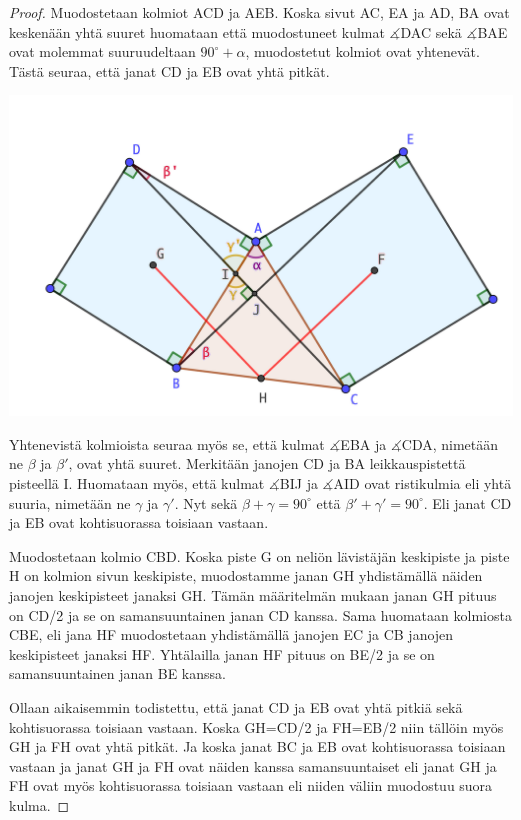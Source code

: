 \documentclass{scrartcl}
\begin{document}
\begin{proof}
Muodostetaan kolmiot ACD ja AEB. Koska sivut AC, EA ja AD, BA ovat keskenään yhtä suuret huomataan että muodostuneet kulmat $\measuredangle$DAC sekä $\measuredangle$BAE ovat molemmat suuruudeltaan $90^\circ + \alpha$, muodostetut kolmiot ovat yhtenevät. Tästä seuraa, että janat CD ja EB ovat yhtä pitkät.
\begin{center}
    \includegraphics[scale=0.6]{kolmiojatkoa}
\end{center}

Yhtenevistä kolmioista seuraa myös se, että kulmat $\measuredangle$EBA ja $\measuredangle$CDA, nimetään ne $\beta$ ja $\beta'$, ovat yhtä suuret. Merkitään janojen CD ja BA leikkauspistettä pisteellä I. Huomataan myös, että kulmat $\measuredangle$BIJ ja $\measuredangle$AID ovat ristikulmia eli yhtä suuria, nimetään ne $\gamma$ ja $\gamma'$. Nyt sekä $\beta + \gamma = 90^\circ$ että $\beta' + \gamma' = 90^\circ$. Eli janat CD ja EB ovat kohtisuorassa toisiaan vastaan.

Muodostetaan kolmio CBD. Koska piste G on neliön lävistäjän keskipiste ja piste H on kolmion sivun keskipiste, muodostamme janan GH yhdistämällä näiden janojen keskipisteet janaksi GH. Tämän määritelmän mukaan janan GH pituus on CD/2 ja se on samansuuntainen janan CD kanssa. Sama huomataan kolmiosta CBE, eli jana HF muodostetaan yhdistämällä janojen EC ja CB janojen keskipisteet janaksi HF. Yhtälailla janan HF pituus on BE/2 ja se on samansuuntainen janan BE kanssa.

Ollaan aikaisemmin todistettu, että janat CD ja EB ovat yhtä pitkiä sekä kohtisuorassa toisiaan vastaan. Koska GH=CD/2 ja FH=EB/2 niin tällöin myös GH ja FH ovat yhtä pitkät. Ja koska janat BC ja EB ovat kohtisuorassa toisiaan vastaan ja janat GH ja FH ovat näiden kanssa samansuuntaiset eli janat GH ja FH ovat myös kohtisuorassa toisiaan vastaan eli niiden väliin muodostuu suora kulma.
\end{proof}
\end{document}
